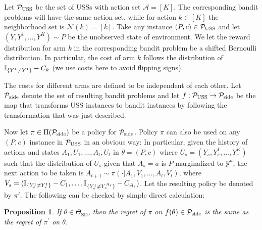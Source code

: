 \documentclass[11pt]{article} %
\newcommand{\todoc}[2][]{\todo[color=Apricot!20,size=\tiny,#1]{Cs: #2}}
\newcommand{\todom}[2][]{\todo[color=Cerulean!20,size=\tiny,#1]{M: #2}}
\newcommand{\SD}{\mathrm{SD}}
\newcommand{\TSD}{\Theta_{\SD}}
\newcommand{\Y}{\mathcal{Y}}
\newcommand{\A}{\mathcal{A}}
\newtheorem{prop}{Proposition}
\begin{document}
Let $\mathcal{P}_{\mathrm{USS}}$ be the set of USSs with action set $\A = [K]$.
The corresponding bandit problems will have the same action set,
while for action $k\in [K]$ the neighborhood set is $\mathcal{N}(k) = [k]$.
Take any instance $(P,c)\in \mathcal{P}_{\mathrm{USS}}$ and let $(Y,Y^1,\dots,Y^K) \sim P$ be the 
unobserved state of environment.
We let the reward distribution for arm $k$ in the corresponding bandit problem
be a shifted Bernoulli distribution.
In particular, the cost of arm $k$ follows the distribution of $\mathbb{I}_{\{Y^k\ne Y^1\}} - C_k$ (we use costs here to avoid flipping signs).

The costs for different arms are defined to be independent of each other.
Let $\mathcal{P}_{\mathrm{side}}$ denote the set of resulting bandit problems and let $f:\mathcal{P}_{\mathrm{USS}} \to \mathcal{P}_{\mathrm{side}}$
be the map that transforms USS instances to bandit instances by following the
transformation that was just described.

Now let $\pi\in \Pi(\mathcal{P}_{\mathrm{side}})$ be a policy for $\mathcal{P}_{\mathrm{side}}$.
Policy $\pi$ can also be used on any $(P,c)$ instance in $\mathcal{P}_{\mathrm{USS}}$ in an obvious way:
In particular, given the history of actions and states $A_1,U_1,\dots,A_t,U_t$
in $\theta=(P,c)$ where $U_s = (Y_s,Y_s^1,\dots,Y_s^{K})$ such that 
the distribution of $U_s$ given that $A_s=a$ is $P$ marginalized to $\Y^{a}$,
the next action to be taken is 
$A_{t+1}\sim \pi(\cdot| A_1, V_1,\dots,A_t,V_t)$, where 
$V_s = (\mathbb{I}_{\{Y_s^1\ne Y_s^1\}}-C_1,\dots,\mathbb{I}_{\{Y_s^1\ne Y_s^{A_s}\}}-C_{A_s})$. Let the resulting policy be denoted by $\pi'$.
The following can be checked by simple direct calculation:
\begin{prop} 
	\label{prop:equivalence}
If $\theta \in \TSD$, then the regret of $\pi$ on $f(\theta)\in \mathcal{P}_{\mathrm{side}}$
is the same as the regret of $\pi^\prime$ on $\theta$. 
\end{prop}
\end{document}
